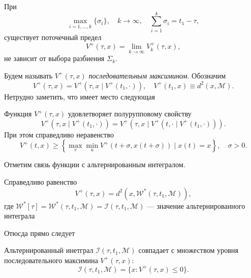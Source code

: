 \begin{lemma}
    При
    \[ 
        \max_{i = 1,\dots,k} \{\sigma_i\}, \quad k \to \infty, \quad \sum_{i = 1}^k \sigma_i = 
         t_1 - \tau, 
    \]
    существует поточечный предел
    \[
        V^+(\tau, x) = \lim_{k \to \infty} V_k^+(\tau, x),
    \]
    не зависит от выбора разбиения \( \Sigma_k \).
\end{lemma}
Будем называть \( V^+(\tau, x) \) \emph{последовательным максимином}. Обозначим
\begin{equation}
    V^+(\tau, x) = V^+(\tau, x \mid V^+(t_1, \cdot)), \quad V^+(t_1, x) \equiv d^2(x,
     \mathcal{M}).
\end{equation}
Нетрудно заметить, что имеет место следующая
\begin{lemma}
    Функция \( V^+(\tau, x) \) удовлетворяет полурупповому свойству
    \[
        V^+(\tau, x \mid V^+(t_1, \cdot)) = V^+(\tau, x \mid V^+(t, \cdot \mid V^+(t_1, 
         \cdot))).  
    \]
    При этом справедливо неравенство
    \[
        V^+(t, x) \ge \left\{ \max_v \min_u V^+(t + \sigma, x(t + \sigma)) \mid x(t) = x 
         \right\}, \quad \sigma > 0.
    \]
\end{lemma}

Отметим связь функции с альтернированным интегралом.
\begin{lemma}
    Справедливо равенство
    \[
        V^+ (\tau, x) = d^2(x, \mathcal{W}^*(\tau, t_1, \mathcal{M})),
    \]
    где \( \mathcal{W}^*[\tau] = \mathcal{W}^*(\tau, t_1, \mathcal{M}) = \mathcal{I}(\tau,
     t_1, \mathcal{M}) \) --- значение альтернированного интеграла
\end{lemma}
Отюсда прямо следует
\begin{lemma}
    Альтернированный инетграл \( \mathcal{I}(\tau, t_1, \mathcal{M}) \) совпадает с
     множеством уровня последовательного максимина \( V^+(\tau, x) \):
    \[
        \mathcal{I}(\tau, t_1, \mathcal{M}) = \{ x : V^+(\tau, x) \le 0 \}.
    \]
\end{lemma}

